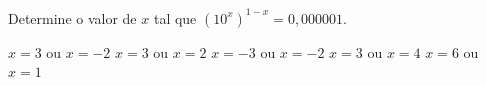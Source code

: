 Determine o valor de $x$ tal que $(10^x)^{1-x}=0{,}000001$.

$x=3$ ou $x=-2$
$x=3$ ou $x=2$
$x=-3$ ou $x=-2$
$x=3$ ou $x=4$
$x=6$ ou $x=1$


